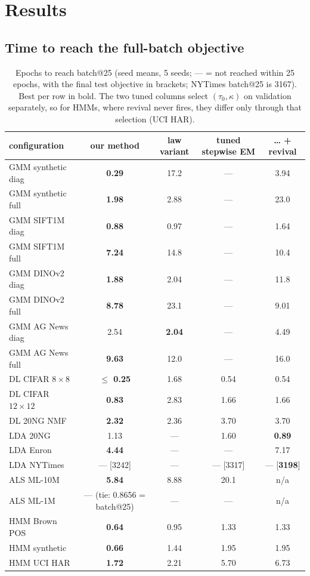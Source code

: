 \documentclass[10pt]{article}
\newcommand{\best}[1]{\textbf{#1}}
\begin{document}
\section{Results}

\subsection{Time to reach the full-batch objective}\label{sec:res-time}

\begin{table}[!htbp]
\centering\small
\caption{Epochs to reach batch@25 (seed means, 5 seeds; --- = not reached within 25 epochs, with the final test
objective in brackets; NYTimes batch@25 is 3167). Best per row in bold. The two tuned columns select
$(\tau_0, \kappa)$ on validation separately, so for HMMs, where revival never fires, they differ only through that
selection (UCI HAR).}
\label{tab:epochs}
\setlength{\tabcolsep}{4pt}
\begin{tabular}{lcccc}
\toprule
configuration & our method & law variant & tuned stepwise EM & \ldots{} + revival \\
\midrule
GMM synthetic diag & \best{0.29} & 17.2 & --- & 3.94 \\
GMM synthetic full & \best{1.98} & 2.88 & --- & 23.0 \\
GMM SIFT1M diag & \best{0.88} & 0.97 & --- & 1.64 \\
GMM SIFT1M full & \best{7.24} & 14.8 & --- & 10.4 \\
GMM DINOv2 diag & \best{1.88} & 2.04 & --- & 11.8 \\
GMM DINOv2 full & \best{8.78} & 23.1 & --- & 9.01 \\
GMM AG News diag & 2.54 & \best{2.04} & --- & 4.49 \\
GMM AG News full & \best{9.63} & 12.0 & --- & 16.0 \\
\midrule
DL CIFAR $8{\times}8$ & \best{$\le$ 0.25} & 1.68 & 0.54 & 0.54 \\
DL CIFAR $12{\times}12$ & \best{0.83} & 2.83 & 1.66 & 1.66 \\
DL 20NG NMF & \best{2.32} & 2.36 & 3.70 & 3.70 \\
\midrule
LDA 20NG & 1.13 & --- & 1.60 & \best{0.89} \\
LDA Enron & \best{4.44} & --- & --- & 7.17 \\
LDA NYTimes & --- [3242] & --- & --- [3317] & --- [\best{3198}] \\
\midrule
ALS ML-10M & \best{5.84} & 8.88 & 20.1 & n/a \\
ALS ML-1M & --- (tie: 0.8656 = batch@25) & --- & --- & n/a \\
\midrule
HMM Brown POS & \best{0.64} & 0.95 & 1.33 & 1.33 \\
HMM synthetic & \best{0.66} & 1.44 & 1.95 & 1.95 \\
HMM UCI HAR & \best{1.72} & 2.21 & 5.70 & 6.73 \\
\bottomrule
\end{tabular}
\end{table}
\end{document}

